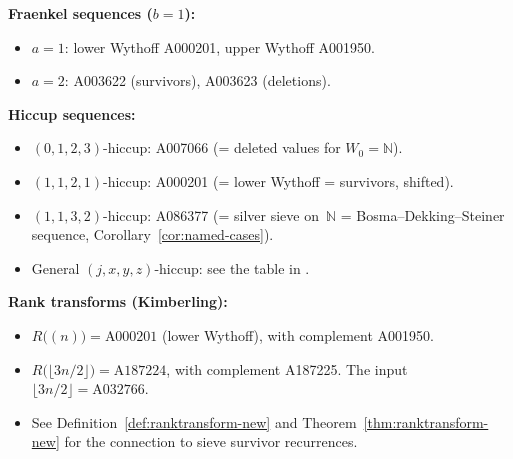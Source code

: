 \documentclass[11pt]{article}
\numberwithin{equation}{section}
\theoremstyle{plain}
\theoremstyle{definition}
\theoremstyle{remark}
\newcommand{\N}{\mathbb{N}}
\begin{document}
\medskip
\noindent\textbf{Fraenkel sequences ($b=1$):}
\begin{itemize}
\item $a=1$: lower Wythoff A000201, upper Wythoff A001950.
\item $a=2$: A003622 (survivors), A003623 (deletions).
\end{itemize}

\medskip
\noindent\textbf{Hiccup sequences:}
\begin{itemize}
\item $(0,1,2,3)$-hiccup: A007066 (= deleted values for $W_0=\N$).
\item $(1,1,2,1)$-hiccup: A000201 (= lower Wythoff = survivors,
  shifted).
\item $(1,1,3,2)$-hiccup: A086377 (= silver sieve on~$\N$ =
  Bosma--Dekking--Steiner sequence, Corollary~\ref{cor:named-cases}).
\item General $(j,x,y,z)$-hiccup: see the table in \cite{FJ2026}.
\end{itemize}

\medskip
\noindent\textbf{Rank transforms (Kimberling):}
\begin{itemize}
\item $R\bigl((n)\bigr) = \text{A000201}$ (lower Wythoff), with
  complement A001950.
\item $R\bigl(\lfloor 3n/2\rfloor\bigr) = \text{A187224}$, with
  complement A187225.  The input $\lfloor 3n/2\rfloor = \text{A032766}$.
\item See Definition~\ref{def:ranktransform-new} and
  Theorem~\ref{thm:ranktransform-new} for the connection to sieve survivor recurrences.
\end{itemize}
\end{document}
